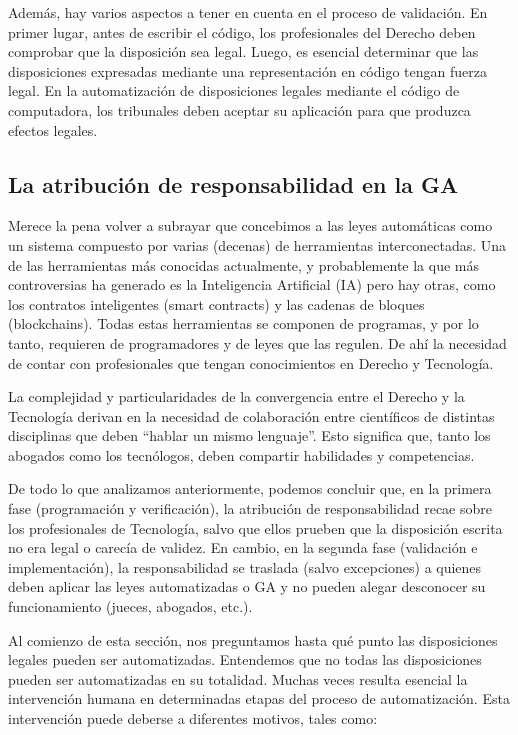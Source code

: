\documentclass[12pt]{report} %
\begin{document}
Además, hay varios aspectos a tener en cuenta en el proceso de validación. En primer lugar, antes de escribir el código, los profesionales del Derecho deben comprobar que la disposición sea legal. Luego, es esencial determinar que las disposiciones expresadas mediante una representación en código tengan fuerza legal. En la automatización de disposiciones legales mediante el código de computadora, los tribunales deben aceptar su aplicación para que produzca efectos legales. 

\subsection{La atribución de responsabilidad en la GA}

Merece la pena volver a subrayar que concebimos a las leyes automáticas como un sistema compuesto por varias (decenas) de herramientas interconectadas. Una de las herramientas más conocidas actualmente, y probablemente la que más controversias ha generado es la Inteligencia Artificial (IA) pero hay otras, como los contratos inteligentes (smart contracts) y las cadenas de bloques (blockchains). Todas estas herramientas se componen de programas, y por lo tanto, requieren de programadores y de leyes que las regulen. De ahí la necesidad de contar con profesionales que tengan conocimientos en Derecho y Tecnología.

La complejidad y particularidades de la convergencia entre el Derecho y la Tecnología derivan en la necesidad de colaboración entre científicos de distintas disciplinas que deben “hablar un mismo lenguaje”. Esto significa que, tanto los abogados como los tecnólogos, deben compartir habilidades y competencias. 

De todo lo que analizamos anteriormente, podemos concluir que, en la primera fase (programación y verificación), la atribución de responsabilidad recae sobre los profesionales de Tecnología, salvo que ellos prueben que la disposición escrita no era legal o carecía de validez.  En cambio, en la segunda fase (validación e implementación), la responsabilidad se traslada (salvo excepciones) a quienes deben aplicar las leyes automatizadas o GA y no pueden alegar desconocer su funcionamiento (jueces, abogados, etc.). 

Al comienzo de esta sección, nos preguntamos hasta qué punto las disposiciones legales pueden ser automatizadas. Entendemos que no todas las disposiciones pueden ser automatizadas en su totalidad. Muchas veces resulta esencial la intervención humana en determinadas etapas del proceso de automatización. Esta intervención puede deberse a diferentes motivos, tales como:
\end{document}
